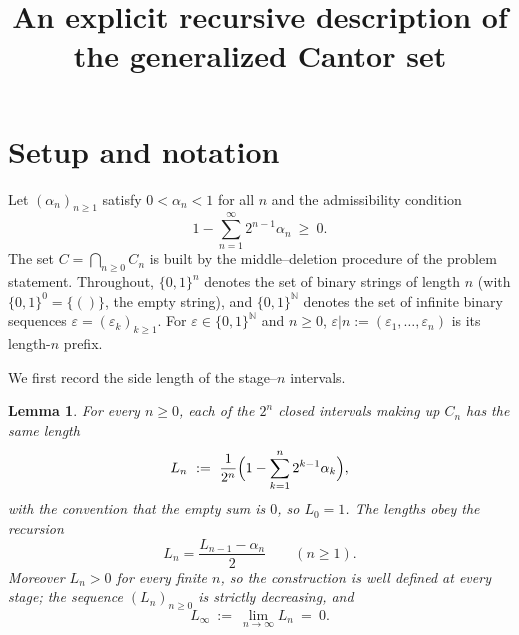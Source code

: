 \documentclass{amsart}
\newtheorem{lemma}{Lemma}
\theoremstyle{definition}
\theoremstyle{remark}
\begin{document}
\title{An explicit recursive description of the generalized Cantor set}
\maketitle

\section{Setup and notation}

Let $(\alpha_n)_{n\ge1}$ satisfy $0<\alpha_n<1$ for all $n$ and the admissibility
condition
\begin{equation}\label{eq:adm}
1-\sum_{n=1}^{\infty}2^{n-1}\alpha_n\ \ge\ 0 .
\end{equation}
The set $C=\bigcap_{n\ge0}C_n$ is built by the middle--deletion procedure of the
problem statement. Throughout, $\{0,1\}^n$ denotes the set of binary strings of
length $n$ (with $\{0,1\}^0=\{()\}$, the empty string), and $\{0,1\}^{\mathbb N}$
denotes the set of infinite binary sequences $\varepsilon=(\varepsilon_k)_{k\ge1}$.
For $\varepsilon\in\{0,1\}^{\mathbb N}$ and $n\ge0$, $\varepsilon|n:=(\varepsilon_1,\dots,\varepsilon_n)$
is its length-$n$ prefix.

We first record the side length of the stage--$n$ intervals.

\begin{lemma}\label{lem:len}
For every $n\ge0$, each of the $2^{n}$ closed intervals making up $C_n$ has the
same length
\begin{equation}\label{eq:Ln}
L_n\ :=\ \frac{1}{2^{n}}\Bigl(1-\sum_{k=1}^{n}2^{k-1}\alpha_k\Bigr),
\end{equation}
with the convention that the empty sum is $0$, so $L_0=1$. The lengths obey the
recursion
\begin{equation}\label{eq:rec}
L_n=\frac{L_{n-1}-\alpha_n}{2}\qquad(n\ge1).
\end{equation}
Moreover $L_n>0$ for every finite $n$, so the construction is well defined at every
stage; the sequence $(L_n)_{n\ge0}$ is strictly decreasing, and
\begin{equation}\label{eq:Linf}
L_\infty\ :=\ \lim_{n\to\infty}L_n\ =\ 0 .
\end{equation}
\end{lemma}
\end{document}

